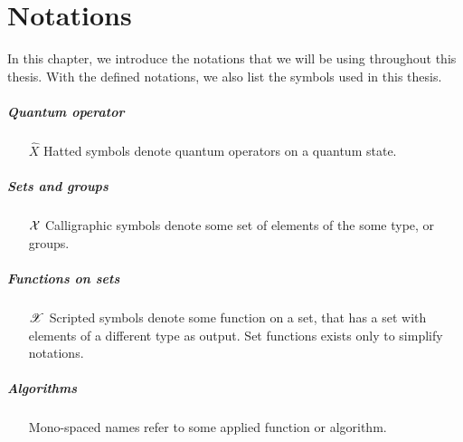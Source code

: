 \chapter{Notations}
In this chapter, we introduce the notations that we will be using throughout this thesis. With the defined notations, we also list the symbols used in this thesis. 

\paragraph{Quantum operator}
\begin{itemize}[leftmargin=4em, align=left]
    \item[$\hat{X}$]  Hatted symbols denote quantum operators on a quantum state.
\end{itemize}

\paragraph{Sets and groups}
\begin{itemize}[leftmargin=4em, align=left]
    \item[$\mathcal{X}$]  Calligraphic symbols denote some set of elements of the some type, or groups. 
\end{itemize}

\paragraph{Functions on sets}
\begin{itemize}[leftmargin=4em, align=left]
    \item[$\mathscr{X}$]  Scripted symbols denote some function on a set, that has a set with elements of a different type as output. Set functions exists only to simplify notations. 
\end{itemize}

\paragraph{Algorithms}
\begin{itemize}[leftmargin=4em, align=left]
    \item[\codefunc{AlgorithmX}] Mono-spaced names refer to some applied function or algorithm. 
\end{itemize}

